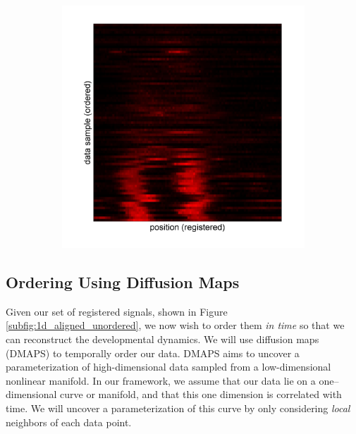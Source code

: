 \documentclass[11pt]{article}
\begin{document}
\begin{figure}
\begin{subfigure}{0.2\textwidth}
\caption{}
\label{subfig:1d_aligned_ordered}
\end{subfigure}
\begin{subfigure}{0.2\textwidth}
\includegraphics[width=\textwidth]{registered_ordered_vdm_1d}
\caption{}
\label{subfig:1d_aligned_ordered_vdm}
\end{subfigure}
\caption{}
\label{fig:1d_demo}
\end{figure}

\subsection{Ordering Using Diffusion Maps}

Given our set of registered signals, shown in Figure \ref{subfig:1d_aligned_unordered}, we now wish to order them {\em in time} so that we can reconstruct the developmental dynamics.
%
We will use diffusion maps (DMAPS) \cite{coifman2005geometric} to temporally order our data.
%
DMAPS aims to uncover a parameterization of high-dimensional data sampled from a low-dimensional nonlinear manifold.
%
In our framework, we assume that our data lie on a one--dimensional curve or manifold, and that this one dimension is correlated with time. 
%
We will uncover a parameterization of this curve by only considering {\em local} neighbors of each data point.
\end{document}
